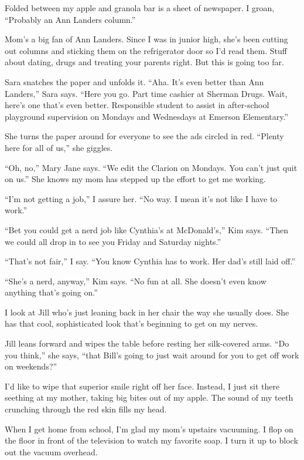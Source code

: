 \documentclass[twoside,10pt]{book}
\begin{document}
Folded between my apple and granola bar is a sheet of newspaper. I
groan, ``Probably an Ann Landers column.''

Mom's a big fan of Ann Landers. Since I was in junior high, she's been
cutting out columns and sticking them on the refrigerator door so I'd
read them. Stuff about dating, drugs and treating your parents right.
But this is going too far.

Sara snatches the paper and unfolds it. ``Aha. It's even better than Ann
Landers,'' Sara says. ``Here you go. Part time cashier at Sherman Drugs.
Wait, here's one that's even better. Responsible student to assist in
after-school playground supervision on Mondays and Wednesdays at Emerson
Elementary.''

She turns the paper around for everyone to see the ads circled in red.
``Plenty here for all of us,'' she giggles.

``Oh, no,'' Mary Jane says. ``We edit the Clarion on Mondays. You can't
just quit on us.'' She knows my mom has stepped up the effort to get me
working.

``I'm not getting a job,'' I assure her. ``No way. I mean it's not like
I have to work.''

``Bet you could get a nerd job like Cynthia's at McDonald's,'' Kim says.
``Then we could all drop in to see you Friday and Saturday nights.''

``That's not fair,'' I say. ``You know Cynthia has to work. Her dad's
still laid off.''

``She's a nerd, anyway,'' Kim says. ``No fun at all. She doesn't even
know anything that's going on.''

I look at Jill who's just leaning back in her chair the way she usually
does. She has that cool, sophisticated look that's beginning to get on
my nerves.

Jill leans forward and wipes the table before resting her silk-covered
arms. ``Do you think,'' she says, ``that Bill's going to just wait
around for you to get off work on weekends?''

I'd like to wipe that superior smile right off her face. Instead, I just
sit there seething at my mother, taking big bites out of my apple. The
sound of my teeth crunching through the red skin fills my head.

When I get home from school, I'm glad my mom's upstairs vacuuming. I
flop on the floor in front of the television to watch my favorite soap.
I turn it up to block out the vacuum overhead.
\end{document}
